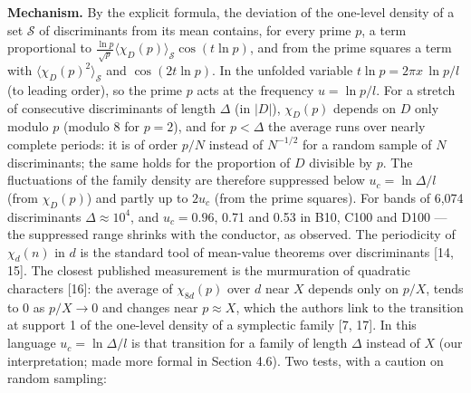 \documentclass[
  10pt,
]{article}
\begin{document}
\textbf{Mechanism.} By the explicit formula, the deviation of the
one-level density of a set \(\mathcal S\) of discriminants from its mean
contains, for every prime \(p\), a term proportional to
\(\frac{\ln p}{\sqrt p}\langle\chi_D(p)\rangle_{\mathcal S}\cos(t\ln p)\),
and from the prime squares a term with
\(\langle\chi_D(p)^2\rangle_{\mathcal S}\) and \(\cos(2t\ln p)\). In the
unfolded variable \(t\ln p = 2\pi x\,\ln p/l\) (to leading order), so
the prime \(p\) acts at the frequency \(u = \ln p/l\). For a stretch of
consecutive discriminants of length \(\Delta\) (in \(|D|\)),
\(\chi_D(p)\) depends on \(D\) only modulo \(p\) (modulo 8 for
\(p = 2\)), and for \(p < \Delta\) the average runs over nearly complete
periods: it is of order \(p/N\) instead of \(N^{-1/2}\) for a random
sample of \(N\) discriminants; the same holds for the proportion of
\(D\) divisible by \(p\). The fluctuations of the family density are
therefore suppressed below \(u_c = \ln\Delta/l\) (from \(\chi_D(p)\))
and partly up to \(2u_c\) (from the prime squares). For bands of 6,074
discriminants \(\Delta \approx 10^4\), and \(u_c = 0.96\), 0.71 and 0.53
in B10, C100 and D100 --- the suppressed range shrinks with the
conductor, as observed. The periodicity of \(\chi_d(n)\) in \(d\) is the
standard tool of mean-value theorems over discriminants {[}14, 15{]}.
The closest published measurement is the murmuration of quadratic
characters {[}16{]}: the average of \(\chi_{8d}(p)\) over \(d\) near
\(X\) depends only on \(p/X\), tends to 0 as \(p/X \to 0\) and changes
near \(p \approx X\), which the authors link to the transition at
support 1 of the one-level density of a symplectic family {[}7, 17{]}.
In this language \(u_c = \ln\Delta/l\) is that transition for a family
of length \(\Delta\) instead of \(X\) (our interpretation; made more
formal in Section 4.6). Two tests, with a caution on random sampling:
\end{document}
